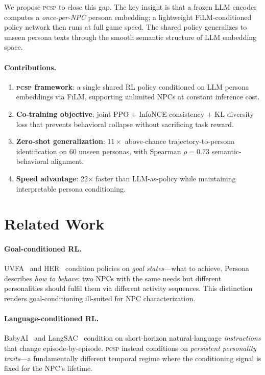 \documentclass{article}
\newcommand{\PCSP}{\textsc{pcsp}}
\begin{document}
We propose \PCSP{} to close this gap.
The key insight is that a frozen LLM encoder computes a \emph{once-per-NPC}
persona embedding; a lightweight FiLM-conditioned policy network then runs at
full game speed.
The shared policy generalizes to unseen persona texts through the smooth semantic
structure of LLM embedding space.

\paragraph{Contributions.}
\begin{enumerate}
  \setlength\itemsep{0pt}
  \item \textbf{\PCSP{} framework}: a single shared RL policy conditioned on
    LLM persona embeddings via FiLM, supporting unlimited NPCs at constant
    inference cost.
  \item \textbf{Co-training objective}: joint PPO + InfoNCE consistency +
    KL diversity loss that prevents behavioral collapse without sacrificing
    task reward.
  \item \textbf{Zero-shot generalization}: $11\times$ above-chance
    trajectory-to-persona identification on 60 unseen personas, with
    Spearman $\rho\!=\!0.73$ semantic-behavioral alignment.
  \item \textbf{Speed advantage}: 22$\times$ faster than LLM-as-policy while
    maintaining interpretable persona conditioning.
\end{enumerate}

\section{Related Work}
\label{sec:related}

\paragraph{Goal-conditioned RL.}
UVFA~\citep{schaul2015uvfa} and HER~\citep{andrychowicz2017her} condition
policies on \emph{goal states}---what to achieve.
Persona describes \emph{how to behave}: two NPCs with the same needs but
different personalities should fulfil them via different activity sequences.
This distinction renders goal-conditioning ill-suited for NPC characterization.

\paragraph{Language-conditioned RL.}
BabyAI~\citep{chevalier2019babyai} and LangSAC~\citep{shao2021langsac}
condition on short-horizon natural-language \emph{instructions} that change
episode-by-episode.
\PCSP{} instead conditions on \emph{persistent personality traits}---a
fundamentally different temporal regime where the conditioning signal is fixed
for the NPC's lifetime.
\end{document}
